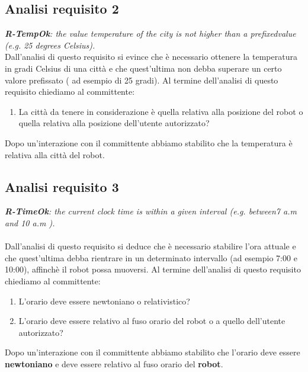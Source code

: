 \documentclass{llncs}
\begin{document}
\subsection{Analisi requisito 2}
\label{ReqAnalysis2}
\textit{\textbf{R-TempOk}: the value temperature of the city is not higher than a prefixedvalue (e.g. 25 degrees Celsius).}
\vspace*{3ex}
\\
Dall'analisi di questo requisito si evince che \`e necessario ottenere la temperatura in gradi Celsius di una citt\`a e che quest'ultima non debba superare un certo valore prefissato ( ad esempio di 25 gradi).
Al termine dell'analisi di questo requisito chiediamo al committente:
\begin{enumerate}
    \item La citt\`a da tenere in considerazione \`e quella relativa alla posizione del robot o quella relativa alla posizione dell'utente autorizzato?
\end{enumerate}
Dopo un'interazione con il committente abbiamo stabilito che la temperatura \`e relativa alla citt\`a del robot.



\subsection{Analisi requisito 3}
\label{ReqAnalysis3}
\textit{\textbf{R-TimeOk}: the current clock time is within a given interval (e.g. between7 a.m and 10 a.m ).}\\
\vspace*{3ex}
\\
Dall'analisi di questo requisito si deduce che \`e necessario stabilire l'ora attuale e che quest'ultima debba rientrare in un determinato intervallo (ad esempio 7:00 e 10:00), affinch\`e il robot possa muoversi.
Al termine dell'analisi di questo requisito chiediamo al committente:
\begin{enumerate}
    \item L'orario deve essere newtoniano o relativistico?
    \item L'orario deve essere relativo al fuso orario del  robot o a quello dell'utente autorizzato?
\end{enumerate}
Dopo un'interazione con il committente abbiamo stabilito che l'orario deve essere \textbf{newtoniano} e deve essere relativo al fuso orario del \textbf{robot}.
\end{document}
